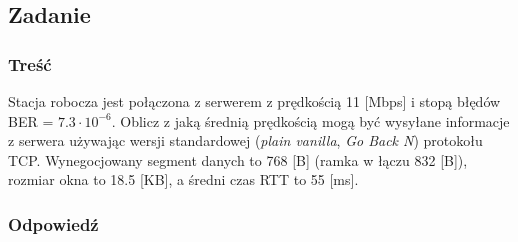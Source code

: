 	\subsection{Zadanie}
		\subsubsection{Treść}
			Stacja robocza jest połączona z serwerem z prędkością 11 [Mbps] i stopą błędów BER = $ 7.3 \cdot 10 ^ {-6} $. Oblicz z jaką średnią prędkością mogą być wysyłane informacje z serwera używając wersji standardowej (\emph{plain vanilla}, \emph{Go Back N}) protokołu TCP. Wynegocjowany segment danych to 768 [B] (ramka w łączu 832 [B]), rozmiar okna to 18.5 [KB], a średni czas RTT to 55 [ms].
		\subsubsection{Odpowiedź}
